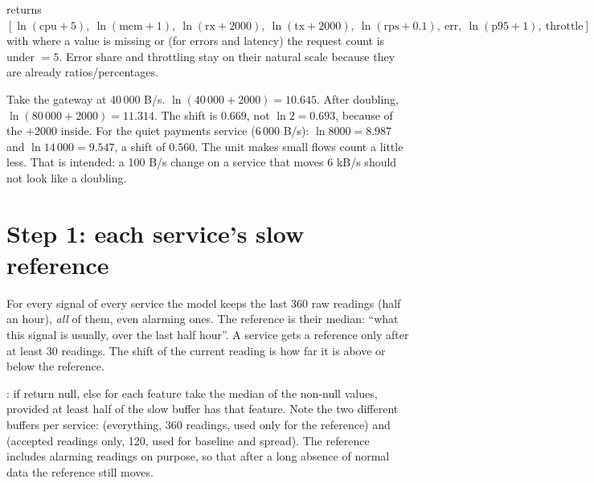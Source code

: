 \begin{techbox}
 returns $[\ln(\mathrm{cpu}+5),\ \ln(\mathrm{mem}+1),\ \ln(\mathrm{rx}+2000),\ \ln(\mathrm{tx}+2000),\ \ln(\mathrm{rps}+0.1),\ \mathrm{err},\ \ln(\mathrm{p95}+1),\ \mathrm{throttle}]$ with  where a value is missing or (for errors and latency) the request count is under $=5$. Error share and throttling stay on their natural scale because they are already ratios/percentages.
\end{techbox}

\begin{examplebox}
Take the gateway at 40\,000 B/s. $\ln(40\,000+2000)=10.645$. After doubling, $\ln(80\,000+2000)=11.314$. The shift is $0.669$, not $\ln2=0.693$, because of the $+2000$ inside. For the quiet payments service (6\,000 B/s): $\ln 8000=8.987$ and $\ln 14\,000=9.547$, a shift of $0.560$. The unit makes small flows count a little less. That is intended: a 100 B/s change on a service that moves 6 kB/s should not look like a doubling.
\end{examplebox}

\section{Step 1: each service's slow reference}
\begin{simplebox}
For every signal of every service the model keeps the last 360 raw readings (half an hour), \emph{all} of them, even alarming ones. The reference is their median: ``what this signal is usually, over the last half hour''. A service gets a reference only after at least 30 readings. The shift of the current reading is how far it is above or below the reference.
\end{simplebox}

\begin{techbox}
: if  return null, else for each feature take the median of the non-null values, provided at least half of the slow buffer has that feature. Note the two different buffers per service:  (everything, 360 readings, used only for the reference) and  (accepted readings only, 120, used for baseline and spread). The reference includes alarming readings on purpose, so that after a long absence of normal data the reference still moves.
\end{techbox}


